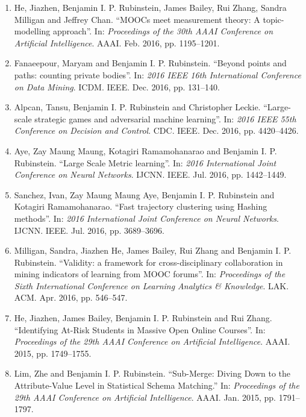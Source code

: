 \documentclass[a4paper,12pt]{article}
\begin{document}
\begin{enumerate}
\item He, Jiazhen, Benjamin I. P. Rubinstein, James Bailey, Rui Zhang, Sandra Milligan and Jeffrey Chan.
``MOOCs meet measurement theory: A topic-modelling approach''.
In: 
\emph{Proceedings of the 30th AAAI Conference on Artificial Intelligence}.
AAAI.
Feb. 2016, pp. 1195--1201.

\item Fanaeepour, Maryam and Benjamin I. P. Rubinstein.
``Beyond points and paths: counting private bodies''.
In: 
\emph{2016 IEEE 16th International Conference on Data Mining}.
ICDM.
IEEE.
Dec. 2016, pp. 131--140.

\item Alpcan, Tansu, Benjamin I. P. Rubinstein and Christopher Leckie.
``Large-scale strategic games and adversarial machine learning''.
In: 
\emph{2016 IEEE 55th Conference on Decision and Control}.
CDC.
IEEE.
Dec. 2016, pp. 4420--4426.

\item Aye, Zay Maung Maung, Kotagiri Ramamohanarao and Benjamin I. P. Rubinstein.
``Large Scale Metric learning''.
In: 
\emph{2016 International Joint Conference on Neural Networks}.
IJCNN.
IEEE.
Jul. 2016, pp. 1442--1449.

\item Sanchez, Ivan, Zay Maung Maung Aye, Benjamin I. P. Rubinstein and Kotagiri Ramamohanarao.
``Fast trajectory clustering using Hashing methods''.
In: 
\emph{2016 International Joint Conference on Neural Networks}.
IJCNN.
IEEE.
Jul. 2016, pp. 3689--3696.

\item Milligan, Sandra, Jiazhen He, James Bailey, Rui Zhang and Benjamin I. P. Rubinstein.
``Validity: a framework for cross-disciplinary collaboration in mining indicators of learning from MOOC forums''.
In: 
\emph{Proceedings of the Sixth International Conference on Learning Analytics \& Knowledge}.
LAK.
ACM.
Apr. 2016, pp. 546--547.

\item He, Jiazhen, James Bailey, Benjamin I. P. Rubinstein and Rui Zhang.
``Identifying At-Risk Students in Massive Open Online Courses''.
In: 
\emph{Proceedings of the 29th AAAI Conference on Artificial Intelligence}.
AAAI.
2015, pp. 1749--1755.

\item Lim, Zhe and Benjamin I. P. Rubinstein.
``Sub-Merge: Diving Down to the Attribute-Value Level in Statistical Schema Matching.''
In: 
\emph{Proceedings of the 29th AAAI Conference on Artificial Intelligence}.
AAAI.
Jan. 2015, pp. 1791--1797.


\end{enumerate}
\end{document}
